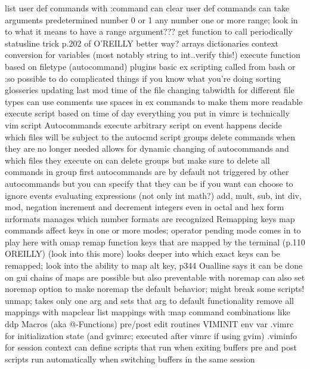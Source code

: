 \documentclass[12pt]{book}
\begin{document}
{{      list user def commands with :command
      can clear user def commands
      can take arguments
        predetermined number
        0 or 1
        any number
        one or more
        range; look in to what it means to have a range argument???
    get function to call periodically
      statusline trick p.202 of O'REILLY
      better way?
    arrays
    dictionaries
    context conversion for variables (most notably string to int..verify this!)
    execute function based on filetype (autocommand)
    plugins
    basic ex scripting called from bash or :so
      possible to do complicated things if you know what you're doing
        sorting glosseries
        updating last mod time of the file
        changing tabwidth for different file types
      can use comments
      use spaces in ex commands to make them more readable
    execute script based on time of day
    everything you put in vimrc is technically vim script
    Autocommands
      execute arbitrary script on event happens
      decide which files will be subject to the autocmd script
      groups
      delete commands when they are no longer needed
        allows for dynamic changing of autocommands and which files they execute on
      can delete groups but make sure to delete all commands in group first
      autocommands are by default not triggered by other autocommands but you can specify that they can be if you want
      can choose to ignore events
    evaluating expressions (not only int math?)
      add, mult, sub, int div, mod, negation
    increment and decrement integers even in octal and hex form
      nrformats manages which number formats are recognized
  Remapping keys
    map commands affect keys in one or more modes; operator pending mode comes in to play here with omap
    remap function keys that are mapped by the terminal (p.110 OREILLY) (look into this more)
      looks deeper into which exact keys can be remapped; look into the ability to map alt key, p344 Oualline says it can be done on gui
    chains of maps are possible but also preventable with noremap
      can also set noremap option to make noremap the default behavior; might break some scripts!
    unmap; takes only one arg and sets that arg to default functionality
    remove all mappings with mapclear
    list mappings with :map
  command combinations like ddp
  Macros (aka @-Functions)
  pre/post edit routines
    VIMINIT env var
    .vimrc for initialization state (and gvimrc; executed after vimrc if using gvim)
    .viminfo for session context
    can define scripts that run when exiting buffers
    pre and post scripts run automatically when switching buffers in the same session
}}
\end{document}
